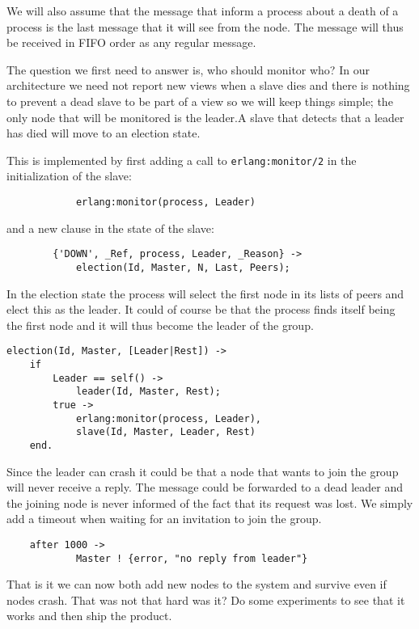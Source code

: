 \documentclass[a4paper,11pt]{article}
\begin{document}
We will also assume that the message that inform a process about a
death of a process is the last message that it will see from the
node. The message will thus be received in FIFO order as any regular
message.

The question we first need to answer is, who should monitor who? In
our architecture we need not report new views when a slave dies and
there is nothing to prevent a dead slave to be part of a view so we
will keep things simple; the only node that will be monitored is the
leader.A slave that detects that a leader has died will move to an
election state. 

This is implemented by first adding a call to {\tt erlang:monitor/2}
in the initialization of the slave:

\begin{verbatim}
            erlang:monitor(process, Leader)
\end{verbatim}

and a new clause in the state of the slave:

\begin{verbatim}
        {'DOWN', _Ref, process, Leader, _Reason} ->
            election(Id, Master, N, Last, Peers);
\end{verbatim}


In the election state the process will select the first node in its
lists of peers and elect this as the leader. It could of course be
that the process finds itself being the first node and it will thus
become the leader of the group.

\begin{verbatim}
election(Id, Master, [Leader|Rest]) ->
    if 
        Leader == self() ->
            leader(Id, Master, Rest);
        true ->
            erlang:monitor(process, Leader),
            slave(Id, Master, Leader, Rest)
    end.
\end{verbatim}

Since the leader can crash it could be that a node that wants to join
the group will never receive a reply. The message could be forwarded
to a dead leader and the joining node is never informed of the fact
that its request was lost. We simply add a timeout when waiting for an
invitation to join the group.

\begin{verbatim}
    after 1000 ->
            Master ! {error, "no reply from leader"}
\end{verbatim}

That is it we can now both add new nodes to the system and survive
even if nodes crash. That was not that hard was it? Do some
experiments to see that it works and then ship the product.
\end{document}
